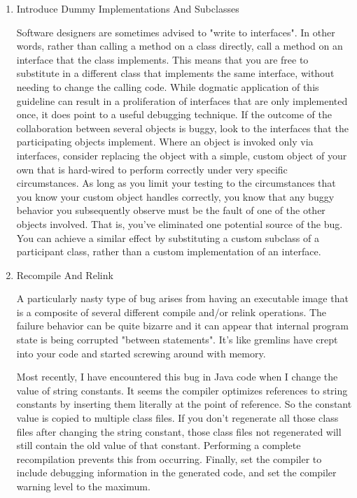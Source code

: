 \documentclass{article}
\begin{document}
\begin{enumerate}
\begin{enumerate}
\item Introduce Dummy Implementations And Subclasses
\label{sec:orgheadline315}

Software designers are sometimes advised to "write to interfaces". In
other words, rather than calling a method on a class directly, call a
method on an interface that the class implements. This means that you
are free to substitute in a different class that implements the same
interface, without needing to change the calling code. While dogmatic
application of this guideline can result in a proliferation of
interfaces that are only implemented once, it does point to a useful
debugging technique. If the outcome of the collaboration between several
objects is buggy, look to the interfaces that the participating objects
implement. Where an object is invoked only via interfaces, consider
replacing the object with a simple, custom object of your own that is
hard-wired to perform correctly under very specific circumstances. As
long as you limit your testing to the circumstances that you know your
custom object handles correctly, you know that any buggy behavior you
subsequently observe must be the fault of one of the other objects
involved. That is, you've eliminated one potential source of the bug.
You can achieve a similar effect by substituting a custom subclass of a
participant class, rather than a custom implementation of an interface.

\item Recompile And Relink
\label{sec:orgheadline316}

A particularly nasty type of bug arises from having an executable image
that is a composite of several different compile and/or relink
operations. The failure behavior can be quite bizarre and it can appear
that internal program state is being corrupted "between statements".
It's like gremlins have crept into your code and started screwing around
with memory.

Most recently, I have encountered this bug in Java code when I change
the value of string constants. It seems the compiler optimizes
references to string constants by inserting them literally at the point
of reference. So the constant value is copied to multiple class files.
If you don't regenerate all those class files after changing the string
constant, those class files not regenerated will still contain the old
value of that constant. Performing a complete recompilation prevents
this from occurring. Finally, set the compiler to include debugging
information in the generated code, and set the compiler warning level to
the maximum.


\end{enumerate}
\end{enumerate}
\end{document}
